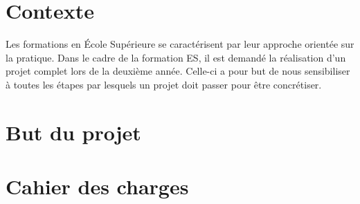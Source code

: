 \section{Contexte}

    Les formations en École Supérieure se caractérisent par leur approche orientée sur la pratique.
    Dans le cadre de la formation ES, il est demandé la réalisation d'un projet complet lors de la deuxième année. Celle-ci a pour but de nous sensibiliser à toutes les étapes par lesquels un projet doit passer pour être concrétiser.
   
    
\section{But du projet}
    \lipsum[1]

\section{Cahier des charges}

    \lipsum[1]
    \lipsum[1]
    \lipsum[1]